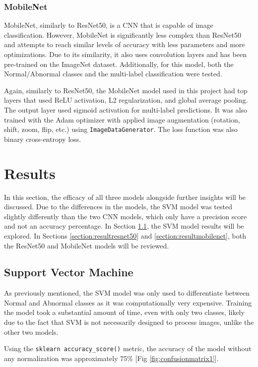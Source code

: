 \documentclass{article}
\theoremstyle{plain}
\theoremstyle{definition}
\theoremstyle{remark}
\begin{document}
\subsubsection{MobileNet}
MobileNet, similarly to ResNet50, is a CNN that is capable of image classification. However,
MobileNet is significantly less complex than ResNet50 and attempts to reach similar levels of
accuracy with less parameters and more optimizations. Due to its similarity, it also uses convolution
layers and has been pre-trained on the ImageNet dataset. Additionally, for this model, both the Normal/Abnormal
classes and the multi-label classification were tested.

Again, similarly to ResNet50, the MobileNet model used in this project had top layers that used ReLU
activation, L2 regularization, and global average pooling. The output layer used sigmoid activation
for multi-label predictions. It was also trained with the Adam optimizer with applied image
augmentation (rotation, shift, zoom, flip, etc.) using \texttt{ImageDataGenerator}. The loss function was also
binary cross-entropy loss.


\section{Results}
In this section, the efficacy of all three models alongside further insights will be discussed.
Due to the differences in the models, the SVM model was tested slightly differently than the two CNN
models, which only have a precision score and not an accuracy percentage.
In Section \ref{section:resultsvm}, the SVM model results will be explored. In Sections
\ref{section:resultresnet50} and \ref{section:resultmobilenet}, both the ResNet50 and MobileNet
models will be reviewed.

\subsection{Support Vector Machine}
\label{section:resultsvm}
As previously mentioned, the SVM model was only used to differentiate between Normal and Abnormal
classes as it was computationally very expensive. Training the model took a substantial amount of
time, even with only two classes, likely due to the fact that SVM is not necessarily designed to
process images, unlike the other two models.

Using the \texttt{sklearn accuracy\_score()} metric, the accuracy of the model without any normalization was
approximately 75\% [Fig \ref{fig:confusionmatrix1}].
\end{document}
